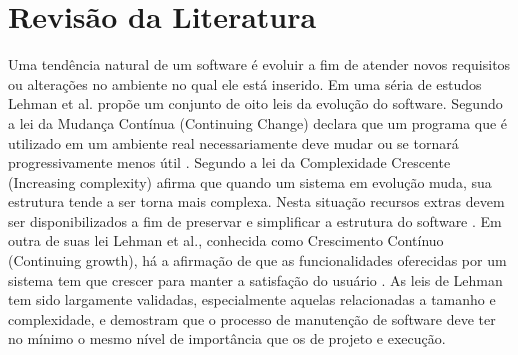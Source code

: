 \documentclass[msc,proposal,hidelot,hideabstract]{ppgccufmg} %
\begin{document}
%
\chapter{Revisão da Literatura}
\label{ch:revisao}

Uma tendência natural de um software é evoluir a fim de atender novos
requisitos ou alterações no ambiente no qual ele está inserido. Em uma séria de
estudos Lehman et al. propõe um conjunto de oito leis da evolução do
software. Segundo a lei da Mudança Contínua (Continuing Change)
 declara que um programa que é utilizado em um
ambiente real necessariamente deve mudar ou se tornará
progressivamente menos útil \cite{lehman1980understanding}. Segundo a lei da
Complexidade Crescente (Increasing complexity) afirma que quando um sistema em
evolução muda, sua estrutura tende a ser torna mais complexa. Nesta situação
recursos extras devem ser disponibilizados a fim de preservar e simplificar a
estrutura do software \cite{lehman1980understanding}. Em outra de suas lei
Lehman et al., conhecida como Crescimento Contínuo (Continuing
growth), há a afirmação de que as funcionalidades oferecidas por um sistema tem
que crescer para manter a satisfação do usuário \cite{lehman1997metrics}. As
  leis de Lehman tem sido largamente validadas, especialmente aquelas
  relacionadas a tamanho e complexidade, e demostram que o processo de
  manutenção de software deve ter no mínimo o mesmo nível de importância que os de projeto e execução.
\end{document}
